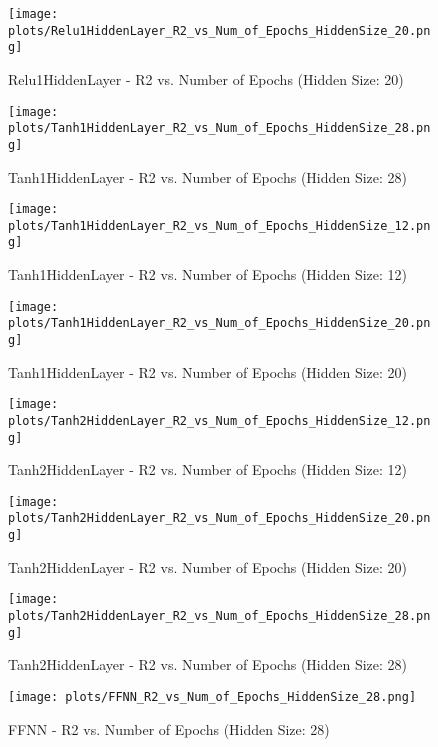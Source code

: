 \begin{figure}[H]
    \centering
    \texttt{[image: plots/Relu1HiddenLayer\_R2\_vs\_Num\_of\_Epochs\_HiddenSize\_20.png]}
    \caption{Relu1HiddenLayer - R2 vs. Number of Epochs (Hidden Size: 20)}
\end{figure}

\begin{figure}[H]
    \centering
    \texttt{[image: plots/Tanh1HiddenLayer\_R2\_vs\_Num\_of\_Epochs\_HiddenSize\_28.png]}
    \caption{Tanh1HiddenLayer - R2 vs. Number of Epochs (Hidden Size: 28)}
\end{figure}

\begin{figure}[H]
    \centering
    \texttt{[image: plots/Tanh1HiddenLayer\_R2\_vs\_Num\_of\_Epochs\_HiddenSize\_12.png]}
    \caption{Tanh1HiddenLayer - R2 vs. Number of Epochs (Hidden Size: 12)}
\end{figure}

\begin{figure}[H]
    \centering
    \texttt{[image: plots/Tanh1HiddenLayer\_R2\_vs\_Num\_of\_Epochs\_HiddenSize\_20.png]}
    \caption{Tanh1HiddenLayer - R2 vs. Number of Epochs (Hidden Size: 20)}
\end{figure}

\begin{figure}[H]
    \centering
    \texttt{[image: plots/Tanh2HiddenLayer\_R2\_vs\_Num\_of\_Epochs\_HiddenSize\_12.png]}
    \caption{Tanh2HiddenLayer - R2 vs. Number of Epochs (Hidden Size: 12)}
\end{figure}

\begin{figure}[H]
    \centering
    \texttt{[image: plots/Tanh2HiddenLayer\_R2\_vs\_Num\_of\_Epochs\_HiddenSize\_20.png]}
    \caption{Tanh2HiddenLayer - R2 vs. Number of Epochs (Hidden Size: 20)}
\end{figure}

\begin{figure}[H]
    \centering
    \texttt{[image: plots/Tanh2HiddenLayer\_R2\_vs\_Num\_of\_Epochs\_HiddenSize\_28.png]}
    \caption{Tanh2HiddenLayer - R2 vs. Number of Epochs (Hidden Size: 28)}
\end{figure}

\begin{figure}[H]
    \centering
    \texttt{[image: plots/FFNN\_R2\_vs\_Num\_of\_Epochs\_HiddenSize\_28.png]}
    \caption{FFNN - R2 vs. Number of Epochs (Hidden Size: 28)}
\end{figure}

